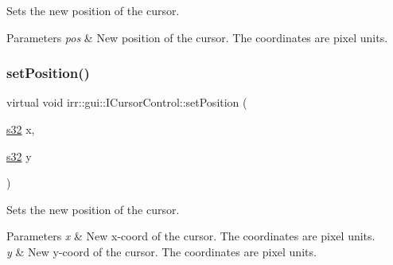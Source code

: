 Sets the new position of the cursor. 


\begin{DoxyParams}{Parameters}
{\em pos} & New position of the cursor. The coordinates are pixel units. \\
\hline
\end{DoxyParams}
\mbox{\label{classirr_1_1gui_1_1ICursorControl_a3b0a59608d1d0810079349acfa01a79b}} 
\subsubsection{\texorpdfstring{set\+Position()}{setPosition()}\hspace{0.1cm}{\footnotesize\ttfamily [7/8]}}
{\footnotesize\ttfamily virtual void irr\+::gui\+::\+I\+Cursor\+Control\+::set\+Position (\begin{DoxyParamCaption}\item[{\hyperlink{namespaceirr_ac66849b7a6ed16e30ebede579f9b47c6}{s32}}]{x,  }\item[{\hyperlink{namespaceirr_ac66849b7a6ed16e30ebede579f9b47c6}{s32}}]{y }\end{DoxyParamCaption})\hspace{0.3cm}{\ttfamily [pure virtual]}}



Sets the new position of the cursor. 


\begin{DoxyParams}{Parameters}
{\em x} & New x-\/coord of the cursor. The coordinates are pixel units. \\
\hline
{\em y} & New y-\/coord of the cursor. The coordinates are pixel units. \\
\hline
\end{DoxyParams}
\mbox{\label{classirr_1_1gui_1_1ICursorControl_a3b0a59608d1d0810079349acfa01a79b}} 
